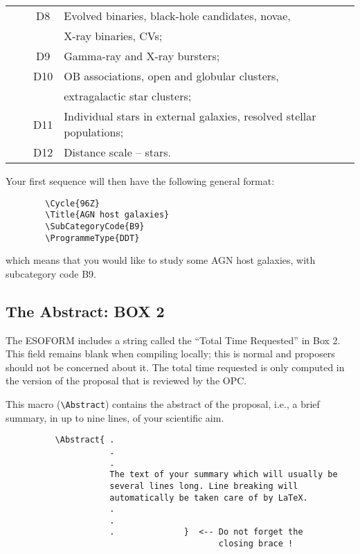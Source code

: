 \documentclass{article}
\begin{document}
\begin{table}[p]
{\begin{center}
\begin{tabular}{llcl}
       &           & D8 & Evolved binaries, black-hole candidates, novae, \\ 
       &           &    &  X-ray binaries, CVs; \\
       &           & D9 & Gamma-ray and X-ray bursters; \\
       &           & D10& OB associations, open and globular clusters, \\
       &           &    &  extragalactic star clusters; \\
       &           & D11& Individual stars in external galaxies, resolved stellar populations; \\
       &           & D12& Distance scale -- stars.\\[4pt]
\hline
\end{tabular}
\end{center}
}
\end{table}

Your first sequence will then have the following general format:
\begin{verbatim}
        \Cycle{96Z}
        \Title{AGN host galaxies}
        \SubCategoryCode{B9}
        \ProgrammeType{DDT}
\end{verbatim}
\noindent which means that you would like to study some AGN host
galaxies, with subcategory code B9.


\subsection{The Abstract:  {\bf BOX 2}}

The ESOFORM includes a string called the
``Total Time Requested'' in Box 2.
This field remains blank when compiling locally; this
is normal and proposers should not be concerned about it.
The total time requested is only computed in the version of the proposal
that is reviewed by the OPC.


This macro (\verb|\Abstract|) contains the  abstract of the  proposal,
i.e., a brief summary, in up to nine lines, of your scientific aim.
\begin{verbatim}
          \Abstract{ .
                     .
                     .
                     The text of your summary which will usually be 
                     several lines long. Line breaking will  
                     automatically be taken care of by LaTeX.
                     .
                     .
                     .              }  <-- Do not forget the
                                           closing brace !
\end{verbatim}
\end{document}
